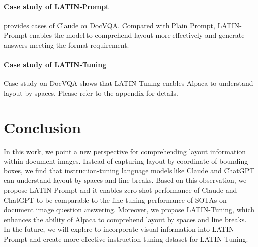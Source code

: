 \documentclass[letterpaper]{article} \usepackage{aaai24_preprint}  \usepackage{times}  \usepackage{helvet}  \usepackage{courier}  \usepackage[hyphens]{url}  \usepackage{graphicx} \urlstyle{rm} \def\UrlFont{\rm}  \usepackage{natbib}  \usepackage{caption} \frenchspacing  \setlength{\pdfpagewidth}{8.5in} \setlength{\pdfpageheight}{11in} \usepackage{algorithm}
\begin{document}
\paragraph{Case study of LATIN-Prompt}
 provides cases of Claude on DocVQA.
Compared with Plain Prompt, LATIN-Prompt enables the model to comprehend layout more effectively and generate answers meeting the format requirement.


\paragraph{Case study of LATIN-Tuning}
Case study on DocVQA shows that LATIN-Tuning enables Alpaca to understand layout by spaces.
Please refer to the appendix for details.





\section{Conclusion}
In this work, we point a new perspective for comprehending layout information within document images.
Instead of capturing layout by coordinate of bounding boxes, we find that instruction-tuning language models like Claude and ChatGPT can understand layout by spaces and line breaks.
Based on this observation, we propose LATIN-Prompt and it enables zero-shot performance of Claude and ChatGPT to be comparable to the fine-tuning performance of SOTAs on document image question answering.
Moreover, we propose LATIN-Tuning, which enhances the ability of Alpaca to comprehend layout by spaces and line breaks.
In the future, we will explore to incorporate visual information into LATIN-Prompt and create more effective instruction-tuning dataset for LATIN-Tuning.



\appendix
\end{document}
